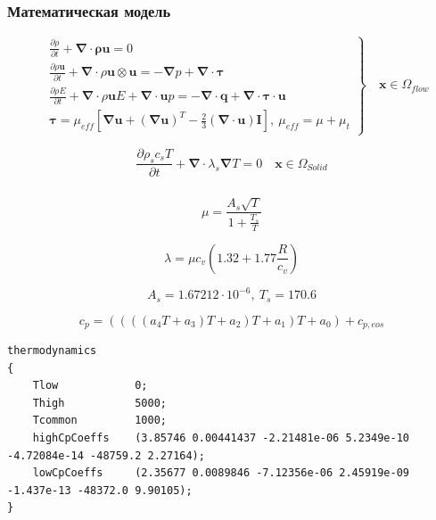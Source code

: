\documentclass[10pt,xcolor={dvipsnames,table},aspectratio=169]{beamer}
\begin{document}
    \begin{frame}{}

        \justifying
        \normalsize

        \frametitle{Математическая модель}

        \[
            \left.
            \begin{aligned}
                &\frac{\partial \rho}{\partial t}
                + \symbf{\nabla} \cdot \symbf{\rho u} = 0 \\
                &\frac{\partial \rho \symbf{u}}{\partial t}
                + \symbf{\nabla} \cdot \rho \symbf{u} \otimes \symbf{u}
                =
                - \symbf{\nabla} p
                + \symbf{\nabla} \cdot \symbf{\tau}\\
                &\frac{\partial \rho E}{\partial t}
                + \symbf{\nabla} \cdot \rho \symbf{u} E
                + \symbf{\nabla} \cdot \symbf{u} p
                =
                - \symbf{\nabla} \cdot \symbf{q}
                + \symbf{\nabla} \cdot \symbf{\tau \cdot \symbf{u}}\\
                &\symbf{\tau} = \mu_{eff} \left[ \symbf{\nabla} \symbf{u} + \left( \symbf{\nabla} \symbf{u} \right) ^{T}  - \frac{2}{3} \left(  \symbf{\nabla} \cdot \symbf{u} \right) \symbf{I} \right], \: \mu_{eff} = \mu + \mu_{t}
            \end{aligned} \right\rbrace \quad \symbf{x} \in \Omega_{flow}
        \]

        \[
            \frac{\partial \rho_{s} c_{s} T}{\partial t} + \symbf{\nabla} \cdot \lambda_{s} \symbf{\nabla} T = 0 \quad \symbf{x} \in \Omega_{Solid}
        \]

    \end{frame}

    \begin{frame}[fragile]

        \justifying
        \normalsize

        \frametitle{}

        \[
             \mu = \frac{A_{s} \sqrt{T}}{1 + \frac{T_{s}}{T}}
        \]

        \[
            \lambda = \mu c_{v} \left( 1.32 + 1.77 \frac{R}{c_{v}} \right)
        \]

        \[
            A_{s} = 1.67212 \cdot 10^{-6}, \: T_{s} = 170.6
        \]

        \[
            c_{p} = ((((a_{4} T + a_{3}) T + a_{2}) T + a_{1}) T + a_{0}) + c_{p, eos}
        \]
        {\centering\scriptsize
        \begin{lstlisting}
thermodynamics
{
    Tlow            0;
    Thigh           5000;
    Tcommon         1000;
    highCpCoeffs    (3.85746 0.00441437 -2.21481e-06 5.2349e-10 -4.72084e-14 -48759.2 2.27164);
    lowCpCoeffs     (2.35677 0.0089846 -7.12356e-06 2.45919e-09 -1.437e-13 -48372.0 9.90105);
}
        \end{lstlisting}
        }

    \end{frame}
\end{document}
